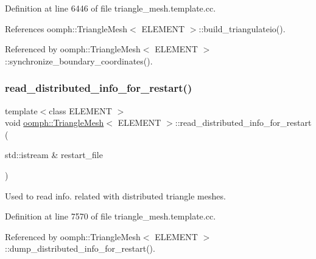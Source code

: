 Definition at line 6446 of file triangle\+\_\+mesh.\+template.\+cc.



References oomph\+::\+Triangle\+Mesh$<$ E\+L\+E\+M\+E\+N\+T $>$\+::build\+\_\+triangulateio().



Referenced by oomph\+::\+Triangle\+Mesh$<$ E\+L\+E\+M\+E\+N\+T $>$\+::synchronize\+\_\+boundary\+\_\+coordinates().

\mbox{\label{classoomph_1_1TriangleMesh_ac023e6d962d37d1cc3089b31dc1d4a2a}} 
\subsubsection{\texorpdfstring{read\+\_\+distributed\+\_\+info\+\_\+for\+\_\+restart()}{read\_distributed\_info\_for\_restart()}}
{\footnotesize\ttfamily template$<$class E\+L\+E\+M\+E\+NT $>$ \\
void \hyperlink{classoomph_1_1TriangleMesh}{oomph\+::\+Triangle\+Mesh}$<$ E\+L\+E\+M\+E\+NT $>$\+::read\+\_\+distributed\+\_\+info\+\_\+for\+\_\+restart (\begin{DoxyParamCaption}\item[{std\+::istream \&}]{restart\+\_\+file }\end{DoxyParamCaption})}



Used to read info. related with distributed triangle meshes. 



Definition at line 7570 of file triangle\+\_\+mesh.\+template.\+cc.



Referenced by oomph\+::\+Triangle\+Mesh$<$ E\+L\+E\+M\+E\+N\+T $>$\+::dump\+\_\+distributed\+\_\+info\+\_\+for\+\_\+restart().

\mbox{\label{classoomph_1_1TriangleMesh_a64a1a162d84647e1821813f245b96734}} 
